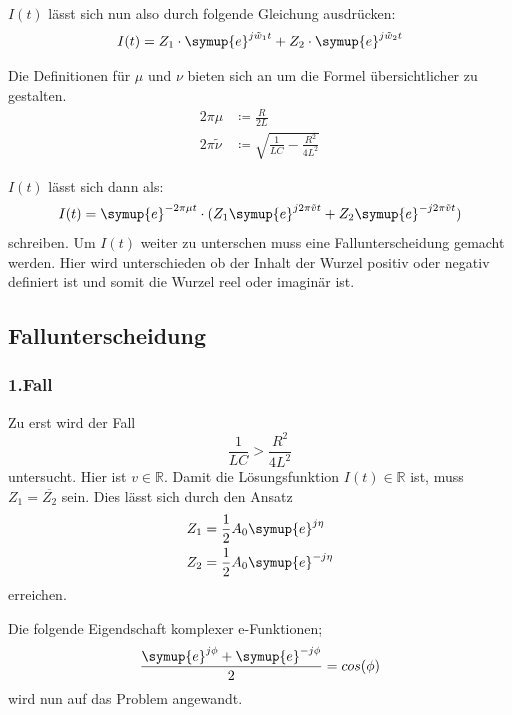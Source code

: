    \noindent $I(t)$ lässt sich nun also durch folgende Gleichung ausdrücken:
    \begin{equation}
        I(t) = Z_1 \cdot \symup{e}^{j \tilde{w}_1t} + Z_2 \cdot \symup{e}^{j\tilde{w}_2 t} \nonumber
    \end{equation}
    
    \noindent Die Definitionen für $\mu$ und $\nu$ bieten sich an um die Formel übersichtlicher zu gestalten.
    \begin{align}
        2 \pi \mu & \coloneq \frac{R}{2L} \nonumber\\ 
        2 \pi \tilde{\nu} & \coloneq \sqrt{\frac{1}{LC} - \frac{R^2}{4L^2}} \nonumber
    \end{align}

    \noindent $I(t)$ lässt sich dann als:
    \begin{equation}
        I(t) = \symup{e}^{- 2 \pi \mu t} \cdot  (Z_1 \symup{e}^{j 2\pi \tilde{v}t} + Z_2 \symup{e}^{-j 2\pi \tilde{v} t}) \nonumber
    \end{equation}
    \noindent schreiben. Um $I(t)$ weiter zu unterschen muss eine Fallunterscheidung gemacht werden. Hier wird unterschieden ob der 
    Inhalt der Wurzel positiv oder negativ definiert ist und somit die Wurzel reel oder imaginär ist. 
    \subsection{Fallunterscheidung}

        \subsubsection{1.Fall}
        Zu erst wird der Fall
        \begin{equation}
            \frac{1}{LC} > \frac{R^2}{4L^2}  \nonumber
        \end{equation}
        \noindent untersucht. Hier ist $v \in \mathds{R}$. Damit die Lösungsfunktion $I(t) \in \mathds{R}$ ist, muss
        $Z_1 = \overline{Z_2}$ sein. Dies lässt sich durch den Ansatz
        \begin{align}
            Z_1 & = \frac{1}{2} A_0 \symup{e}^{j \eta } \nonumber\\
            Z_2 & = \frac{1}{2} A_0 \symup{e}^{-j \eta} \nonumber
        \end{align}
        \noindent erreichen.
        
        \noindent Die folgende Eigendschaft komplexer e-Funktionen;
        \begin{equation}
            \frac{\symup{e}^{j \phi} + \symup{e}^{-j \phi}}{2} = cos(\phi) \nonumber
        \end{equation}
        \noindent wird nun auf das Problem angewandt.

